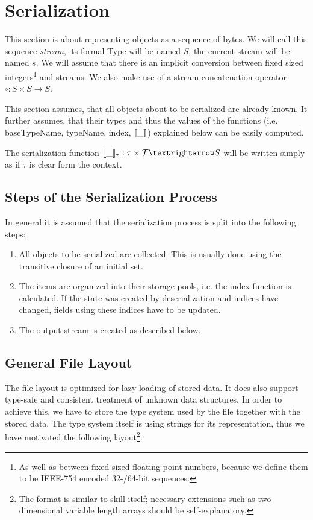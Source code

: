 \section{Serialization}
\label{serialization}

This section is about representing objects as a sequence of bytes. We will call this sequence \textit{stream}, its formal Type will be named $S$, the current stream will be named $s$. We will assume that there is an implicit conversion between fixed sized integers\footnote{As well as between fixed sized floating point numbers, because we define them to be IEEE-754 encoded 32-/64-bit sequences.} and streams. We also make use of a stream concatenation operator $\circ : S \times S → S$.

This section assumes, that all objects about to be serialized are already known. It further assumes, that their types and thus the values of the functions (i.e. baseTypeName, typeName, index, $[\![\_]\!]$) explained below can be easily computed.

The serialization function $\den{\_}_\tau : \tau \times \mathcal{T} → S$ will be written simply as \den{\_} if $\tau$ is clear form the context.


\subsection{Steps of the Serialization Process}

In general it is assumed that the serialization process is split into the following steps:
\begin{enumerate}
 \item All objects to be serialized are collected. This is usually done using the transitive closure of an initial set.
 
 \item The items are organized into their storage pools, i.e. the index function is calculated. If the state was created by deserialization and indices have changed, fields using these indices have to be updated.
 
 \item The output stream is created as described below.
\end{enumerate}

\subsection{General File Layout}

The file layout is optimized for lazy loading of stored data. It does also support type-safe and consistent treatment of unknown data structures. In order to achieve this, we have to store the type system used by the file together with the stored data. The type system itself is using strings for its representation, thus we have motivated the following layout\footnote{The format is similar to skill itself; necessary extensions such as two dimensional variable length arrays should be self-explanatory.}:

